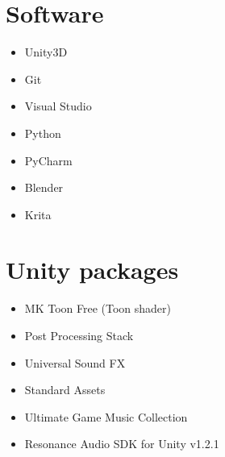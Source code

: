 \documentclass[a4paper, twoside, 10pt]{report}
\begin{document}
\section{Software}
\begin{itemize}
\item Unity3D
\item Git
\item Visual Studio
\item Python
\item PyCharm
\item Blender
\item Krita
\end{itemize}

\section{Unity packages}
\begin{itemize}
\item MK Toon Free (Toon shader) %
\item Post Processing Stack %
\item Universal Sound FX %
\item Standard Assets %
\item Ultimate Game Music Collection %
\item Resonance Audio SDK for Unity v1.2.1 %
\end{itemize}
\end{document}
